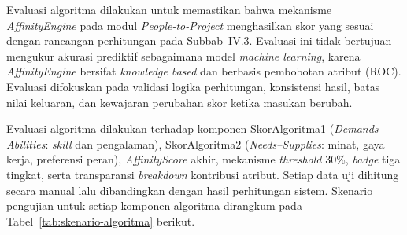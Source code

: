 Evaluasi algoritma dilakukan untuk memastikan bahwa mekanisme \emph{AffinityEngine} pada modul \emph{People-to-Project} menghasilkan skor yang sesuai dengan rancangan perhitungan pada Subbab~IV.3. Evaluasi ini tidak bertujuan mengukur akurasi prediktif sebagaimana model \emph{machine learning}, karena \emph{AffinityEngine} bersifat \emph{knowledge based} dan berbasis pembobotan atribut (ROC). Evaluasi difokuskan pada validasi logika perhitungan, konsistensi hasil, batas nilai keluaran, dan kewajaran perubahan skor ketika masukan berubah.

Evaluasi algoritma dilakukan terhadap komponen SkorAlgoritma1 (\emph{Demands--Abilities}: \emph{skill} dan pengalaman), SkorAlgoritma2 (\emph{Needs--Supplies}: minat, gaya kerja, preferensi peran), \emph{AffinityScore} akhir, mekanisme \emph{threshold} 30\%, \emph{badge} tiga tingkat, serta transparansi \emph{breakdown} kontribusi atribut. Setiap data uji dihitung secara manual lalu dibandingkan dengan hasil perhitungan sistem. Skenario pengujian untuk setiap komponen algoritma dirangkum pada Tabel~\ref{tab:skenario-algoritma} berikut.

